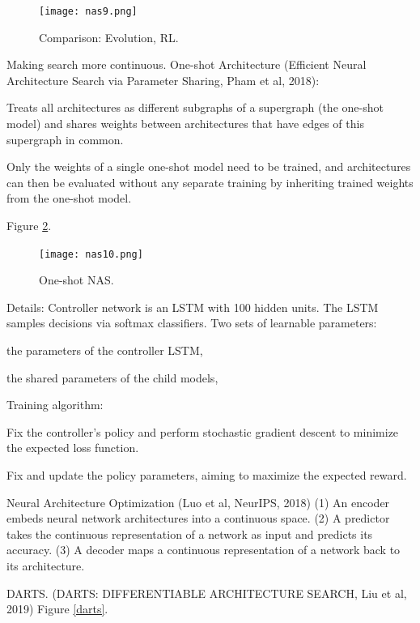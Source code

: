 \documentclass[english]{article}
\begin{document}
\begin{figure}[h!]
  \centering
  \texttt{[image: nas9.png]}
  \caption{Comparison: Evolution, RL.}
  \label{nas9}
\end{figure}

\item Making search more continuous. One-shot Architecture (Efficient Neural Architecture Search via Parameter Sharing, Pham et al, 2018):

Treats all architectures as different subgraphs of a supergraph (the one-shot model) and shares weights between architectures that have edges of this supergraph in common.


Only the weights of a single one-shot model need to be trained, and architectures can then be evaluated without any separate training by inheriting trained weights from the one-shot model.

\item 
Figure \ref{nas10}.


\begin{figure}[h!]
  \centering
  \texttt{[image: nas10.png]}
  \caption{One-shot NAS.}
  \label{nas10}
\end{figure}

\item Details: 
Controller network is an LSTM with 100 hidden units. The LSTM samples decisions via softmax classifiers. Two sets of learnable parameters:
\benum 
\item 
 the parameters of the controller LSTM, 
 \item
  the shared parameters of the child models, 
\eenum 

Training algorithm: 
\benum 
\item 
Fix the controller's policy and perform stochastic gradient descent  to minimize the expected loss function.
 \item
Fix  and update the policy parameters, aiming to maximize the expected reward.
\eenum 



\eenum 

\item Neural Architecture Optimization (Luo et al, NeurIPS, 2018) (1) An encoder embeds
neural network architectures into a continuous space. (2) A predictor takes the
continuous representation of a network as input and predicts its accuracy. (3) A
decoder maps a continuous representation of a network back to its architecture.



\item DARTS. (DARTS: DIFFERENTIABLE ARCHITECTURE SEARCH, Liu et al, 2019)
Figure \ref{darts}.
\end{document}
